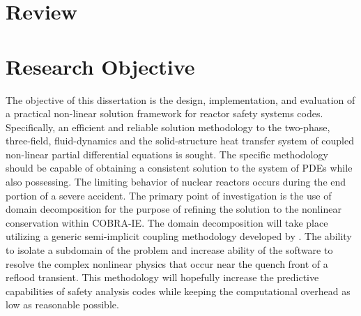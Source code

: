 \section{Review}
\label{sect:review}
\section{Research Objective}
The objective of this dissertation is the design, implementation, and evaluation of a practical non-linear solution framework for reactor safety systems codes.
Specifically, an efficient and reliable solution methodology to the two-phase, three-field, fluid-dynamics and the solid-structure heat transfer system of coupled non-linear partial differential equations is sought.
The specific methodology should be capable of obtaining a consistent solution to the system of PDEs while also possessing. \cite{Aktas1996}
The limiting behavior of nuclear reactors occurs during the end portion of a severe accident.
The primary point of investigation is the use of domain decomposition for the purpose of refining the solution to the nonlinear conservation within COBRA-IE.
The domain decomposition will take place utilizing a generic semi-implicit coupling methodology developed by \citet{Weaver2002}.
The ability to isolate a subdomain of the problem and increase ability of the software to resolve the complex nonlinear physics that occur near the quench front of a reflood transient.
This methodology will hopefully increase the predictive capabilities of safety analysis codes while keeping the computational overhead as low as reasonable possible.